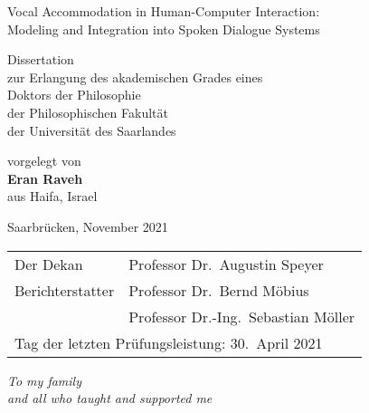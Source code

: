 
\begin{center}
	{\LARGE Vocal Accommodation in Human-Computer Interaction:\\
		Modeling and Integration into Spoken Dialogue Systems\\[4cm]
	}

   	{\large
		Dissertation\\
		zur Erlangung des akademischen Grades eines\\
		Doktors der Philosophie\\
		der Philosophischen Fakultät\\
		der Universität des Saarlandes\\[2cm]
	}
   	
   	{\large vorgelegt von\\[1cm]}
   	{\Large \textbf{Eran Raveh}\\[.5cm]}
   	{\large aus Haifa, Israel\\[4cm]}
   	
	Saarbrücken, November 2021	
\end{center}
\newpage
\vspace*{\fill}\noindent
\begin{tabular}{ll}
	\large{Der Dekan}			&	\large{Professor Dr.\ Augustin Speyer}\\
	\large{Berichterstatter}	&	\large{Professor Dr.\ Bernd Möbius}\\
								&	\large{Professor Dr.-Ing.\ Sebastian Möller}\\[1cm]
	\multicolumn{2}{l}{Tag der letzten Prüfungsleistung: 30.\ April 2021}
\end{tabular}
\newpage

\mbox{} %
\newpage
\vspace*{4cm}
\begin{flushright}
        \textit{\large To my family\\and all who taught and supported me}
\end{flushright}
\newpage

